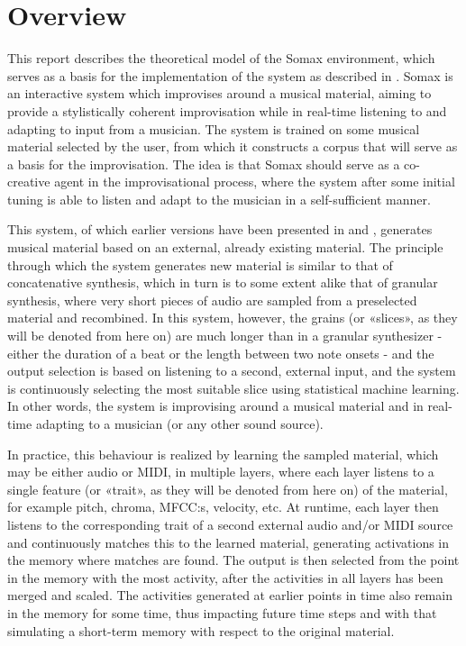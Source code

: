 \section{Overview}\label{sec:3-overview}
This report describes the theoretical model of the Somax environment, which serves as a basis for the implementation of the system as described in \cite{somaxsoftware2021}. Somax is an interactive system which improvises around a musical material, aiming to provide a stylistically coherent improvisation while in real-time listening to and adapting to input from a musician. The system is trained on some musical material selected by the user, from which it constructs a corpus that will serve as a basis for the improvisation. The idea is that Somax should serve as a co-creative agent in the improvisational process, where the system after some initial tuning is able to listen and adapt to the musician in a self-sufficient manner.

This system, of which earlier versions have been presented in \cite{bonnasse-gahot_update_2014} and \cite{borg_2019}, generates musical material based on an external, already existing material. The principle through which the system generates new material is similar to that of concatenative synthesis, which in turn is to some extent alike that of granular synthesis, where very short pieces of audio are sampled from a preselected material and recombined. In this system, however, the grains (or «slices», as they will be denoted from here on) are much longer than in a granular synthesizer - either the duration of a beat or the length between two note onsets - and the output selection is based on listening to a second, external input, and the system is continuously selecting the most suitable slice using statistical machine learning. In other words, the system is improvising around a musical material and in real-time adapting to a musician (or any other sound source). 

In practice, this behaviour is realized by learning the sampled material, which may be either audio or MIDI, in multiple layers, where each layer listens to a single feature (or «trait», as they will be denoted from here on)  of the material, for example pitch, chroma, MFCC:s, velocity, etc. At runtime, each layer then listens to the corresponding trait of a second external audio and/or MIDI source and continuously matches this to the learned material, generating activations in the memory where matches are found. The output is then selected from the point in the memory with the most activity, after the activities in all layers has been merged and scaled. The activities generated at earlier points in time also remain in the memory for some time, thus impacting future time steps and with that simulating a short-term memory with respect to the original material.

